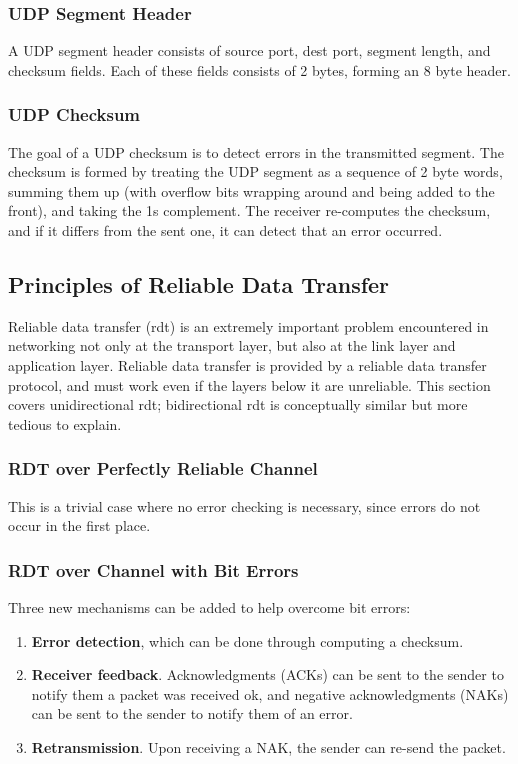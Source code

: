 \documentclass[12pt,titlepage]{article}
\begin{document}
      \subsubsection{UDP Segment Header}
        A UDP segment header consists of source port, dest port, segment length, and checksum fields. Each of these fields consists of 2 bytes, forming an 8 byte header.

      \subsubsection{UDP Checksum}
        The goal of a UDP checksum is to detect errors in the transmitted segment. The checksum is formed by treating the UDP segment as a sequence of 2 byte words, summing
        them up (with overflow bits wrapping around and being added to the front), and taking the 1s complement. The receiver re-computes the checksum, and if it differs from
        the sent one, it can detect that an error occurred.

    \subsection{Principles of Reliable Data Transfer}
      Reliable data transfer (rdt) is an extremely important problem encountered in networking not only at the transport layer, but also at the link layer and application layer. Reliable
      data transfer is provided by a reliable data transfer protocol, and must work even if the layers below it are unreliable. This section covers unidirectional rdt; bidirectional rdt
      is conceptually similar but more tedious to explain.

      \subsubsection{RDT over Perfectly Reliable Channel}
        This is a trivial case where no error checking is necessary, since errors do not occur in the first place.

      \subsubsection{RDT over Channel with Bit Errors}
        Three new mechanisms can be added to help overcome bit errors:
        \begin{enumerate}
          \item \textbf{Error detection}, which can be done through computing a checksum.
          \item \textbf{Receiver feedback}. Acknowledgments (ACKs) can be sent to the sender to notify them a packet was received ok, and negative acknowledgments (NAKs) can be sent to the
          sender to notify them of an error.
          \item \textbf{Retransmission}. Upon receiving a NAK, the sender can re-send the packet.
        \end{enumerate}
\end{document}
